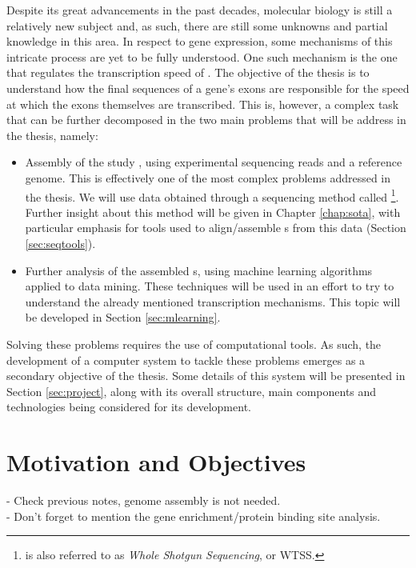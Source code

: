 Despite its great advancements in the past decades, molecular biology is still a
relatively new subject and, as such, there are still some unknowns and partial
knowledge in this area. In respect to gene expression, some mechanisms of this
intricate process are yet to be fully understood. One such mechanism is the one
that regulates the transcription speed of \rna. The objective of the thesis is
to understand how the final sequences of a gene's exons are responsible for the
speed at which the exons themselves are transcribed. This is, however, a complex
task that can be further decomposed in the two main problems that will be
address in the thesis, namely:

\begin{itemize}

  \item
  Assembly of the study \trans, using experimental sequencing reads and a
  reference genome. This is effectively one of the most complex problems
  addressed in the thesis. We will use data obtained through a sequencing method
  called \rnaseq{}\footnote{\rnaseq{} is also referred to as \textit{Whole \Trans{}
  Shotgun Sequencing}, or WTSS.}. Further insight about this method will be
  given in Chapter \ref{chap:sota}, with particular emphasis for tools used to
  align/assemble \trans s from this data (Section \ref{sec:seqtools}).

  \item
  Further analysis of the assembled \trans s, using machine learning algorithms
  applied to data mining. These techniques will be used in an effort to try to
  understand the already mentioned transcription mechanisms. This topic will be
  developed in Section \ref{sec:mlearning}.

\end{itemize}

Solving these problems requires the use of computational tools. As such, the
development of a computer system to tackle these problems emerges as a secondary
objective of the thesis. Some details of this system will be presented in
Section \ref{sec:project}, along with its overall structure, main components and
technologies being considered for its development.

\section{Motivation and Objectives} \label{sec:motivation}

\begin{Notes}
- Check previous notes, genome assembly is not needed.\\
- Don't forget to mention the gene enrichment/protein binding site analysis.
\end{Notes}

